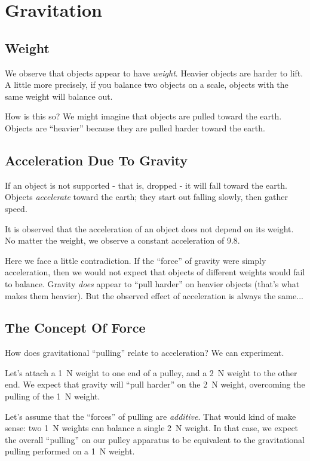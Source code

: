 \section{Gravitation}

\subsection{Weight}

We observe that objects appear to have \emph{weight}. Heavier objects
are harder to lift. A little more precisely, if you balance two objects
on a scale, objects with the same weight will balance out.

How is this so? We might imagine that objects are pulled toward the
earth. Objects are ``heavier'' because they are pulled harder toward the
earth.

\subsection{Acceleration Due To Gravity}

If an object is not supported - that is, dropped - it will fall toward
the earth. Objects \emph{accelerate} toward the earth; they start out
falling slowly, then gather speed.

It is observed that the acceleration of an object does not depend on its
weight. No matter the weight, we observe a constant acceleration of
\SI{9.8}{\mpss}.

Here we face a little contradiction. If the ``force'' of gravity were
simply acceleration, then we would not expect that objects of different
weights would fail to balance. Gravity \emph{does} appear to ``pull
harder'' on heavier objects (that's what makes them heavier). But the
observed effect of acceleration is always the same...

\subsection{The Concept Of Force}

How does gravitational ``pulling'' relate to acceleration? We can
experiment.

Let's attach a \SI{1}{N} weight to one end of a pulley, and a \SI{2}{N}
weight to the other end. We expect that gravity will ``pull harder'' on
the \SI{2}{N} weight, overcoming the pulling of the \SI{1}{N} weight.

Let's assume that the ``forces'' of pulling are \emph{additive}. That would
kind of make sense: two \SI{1}{N} weights can balance a single \SI{2}{N}
weight. In that case, we expect the overall ``pulling'' on our pulley
apparatus to be equivalent to the gravitational pulling performed on a
\SI{1}{N} weight.

